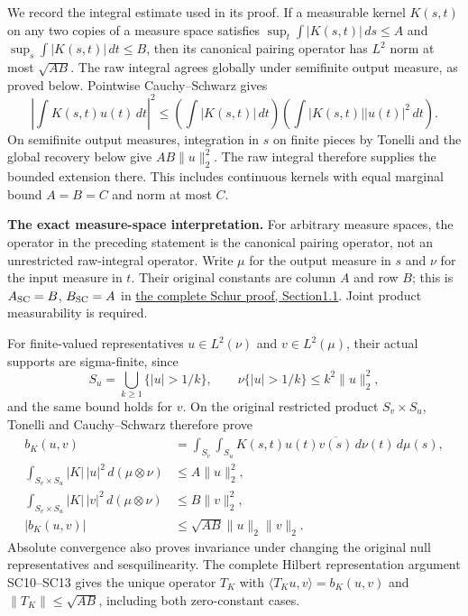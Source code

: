 \documentclass[
  11pt,
]{article}
\begin{document}
We record the integral estimate used in its proof. If a measurable
kernel \(K(s,t)\) on any two copies of a measure space satisfies
\(\sup_t\int|K(s,t)|\,ds\leq A\) and \(\sup_s\int|K(s,t)|\,dt\leq B\),
then its canonical pairing operator has \(L^2\) norm at most
\(\sqrt{AB}\). The raw integral agrees globally under semifinite output
measure, as proved below. Pointwise Cauchy--Schwarz gives \[
\left|\int K(s,t)u(t)\,dt\right|^2
\leq\left(\int|K(s,t)|\,dt\right)
\left(\int|K(s,t)||u(t)|^2\,dt\right).
\tag{E24}
\] On semifinite output measures, integration in \(s\) on finite pieces
by Tonelli and the global recovery below give \(AB\|u\|_2^2\). The raw
integral therefore supplies the bounded extension there. This includes
continuous kernels with equal marginal bound \(A=B=C\) and norm at most
\(C\).

\textbf{The exact measure-space interpretation.} For arbitrary measure
spaces, the operator in the preceding statement is the canonical pairing
operator, not an unrestricted raw-integral operator. Write \(\mu\) for
the output measure in \(s\) and \(\nu\) for the input measure in \(t\).
Their original constants are column \(A\) and row \(B\); this is
\(A_{\rm SC}=B\), \(B_{\rm SC}=A\) in
\href{totally-characteristic-operators.pdf\#section*.6}{the
complete Schur proof, Section1.1}. Joint product measurability is
required.

For finite-valued representatives \(u\in L^2(\nu)\) and
\(v\in L^2(\mu)\), their actual supports are sigma-finite, since \[
 S_u=\bigcup_{k\geq1}\{|u|>1/k\},\qquad
 \nu\{|u|>1/k\}\leq k^2\|u\|_2^2,
\] and the same bound holds for \(v\). On the original restricted
product \(S_v\times S_u\), Tonelli and Cauchy--Schwarz therefore prove
\[
 \begin{split}
 b_K(u,v)&=\int_{S_v}\int_{S_u}
               K(s,t)u(t)\overline{v(s)}\,d\nu(t)\,d\mu(s),\\
 \int_{S_v\times S_u}|K|\,|u|^2\,d(\mu\otimes\nu)&\leq A\|u\|_2^2,\\
 \int_{S_v\times S_u}|K|\,|v|^2\,d(\mu\otimes\nu)&\leq B\|v\|_2^2,\\
 |b_K(u,v)|&\leq\sqrt{AB}\|u\|_2\|v\|_2.
 \end{split}
 \tag{E24a}
\] Absolute convergence also proves invariance under changing the
original null representatives and sesquilinearity. The complete Hilbert
representation argument SC10--SC13 gives the unique operator \(T_K\)
with \(\langle T_Ku,v\rangle=b_K(u,v)\) and \(\|T_K\|\leq\sqrt{AB}\),
including both zero-constant cases.
\end{document}
